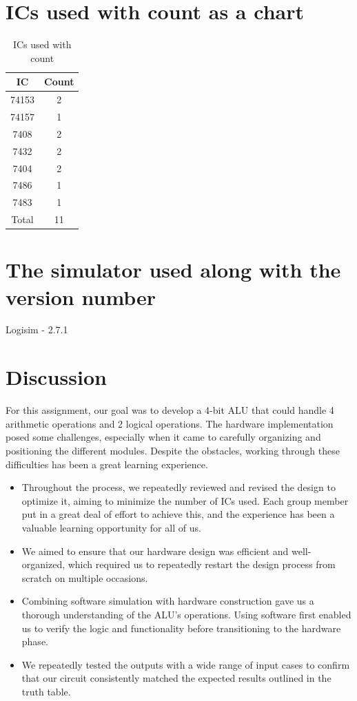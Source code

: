 \documentclass[11pt]{article}
\begin{document}
\section{ICs used with count as a chart}
\begin{table}[ht]
    \centering
    \begin{tabular}{|c|c|}
        \hline
        IC & Count \\
        \hline
        74153 & 2 \\
        \hline
        74157 & 1 \\
        \hline
        7408 & 2 \\
        \hline
        7432 & 2 \\
        \hline
        7404 & 2 \\
        \hline
        7486 & 1 \\
        \hline
        7483 & 1 \\
        \hline
        Total & 11 \\
        \hline
    \end{tabular}
    \caption{ICs used with count}
\end{table}

\section{The simulator used along with the version number}
Logisim - 2.7.1

\pagebreak 

\section{Discussion}

For this assignment, our goal was to develop a 4-bit ALU that could handle 4 arithmetic operations and 2 logical operations. The hardware implementation posed some challenges, especially when it came to carefully organizing and positioning the different modules. Despite the obstacles, working through these difficulties has been a great learning experience.


\begin{itemize}
    \item 
    Throughout the process, we repeatedly reviewed and revised the design to optimize it, aiming to minimize the number of ICs used. Each group member put in a great deal of effort to achieve this, and the experience has been a valuable learning opportunity for all of us.
    \item We aimed to ensure that our hardware design was efficient and well-organized, which required us to repeatedly restart the design process from scratch on multiple occasions.
    \item 
    Combining software simulation with hardware construction gave us a thorough understanding of the ALU's operations. Using software first enabled us to verify the logic and functionality before transitioning to the hardware phase.
    \item We repeatedly tested the outputs with a wide range of input cases to confirm that our circuit consistently matched the expected results outlined in the truth table.
\end{itemize}
\end{document}
